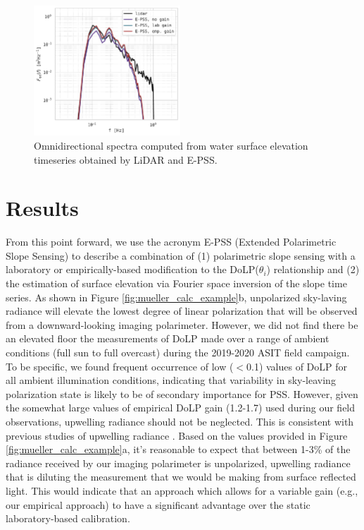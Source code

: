 \documentclass[letterpaper,journal]{IEEEtran}
\begin{document}
\begin{figure}[!ht]
    \centering
    \includegraphics[width=0.49\textwidth]{_figures/elevation_omnispect.pdf}
    \vspace{-25pt}
\caption{Omnidirectional spectra computed from water surface elevation timeseries obtained by LiDAR and E-PSS.}
\label{fig:elevation_omnispect}
\end{figure}

\newpage

\section{Results}
\label{sec:results}

From this point forward, we use the acronym E-PSS (Extended Polarimetric Slope Sensing) to describe a combination of (1) polarimetric slope sensing with a laboratory or empirically-based modification to the DoLP($\theta_i$) relationship and (2) the estimation of surface elevation via Fourier space inversion of the slope time series. As shown in Figure \ref{fig:mueller_calc_example}b, unpolarized sky-laving radiance will elevate the lowest degree of linear polarization that will be observed from a downward-looking imaging polarimeter. However, we did not find there be an elevated floor the measurements of DoLP made over a range of ambient conditions (full sun to full overcast) during the 2019-2020 ASIT field campaign. To be specific, we found frequent occurrence of low ($<$0.1) values of DoLP for all ambient illumination conditions, indicating that variability in sky-leaving polarization state is likely to be of secondary importance for PSS. However, given the somewhat large values of empirical DoLP gain (1.2-1.7) used during our field observations, upwelling radiance should not be neglected. This is consistent with previous studies of upwelling radiance \cite{You2011,ibrahim_relationship_2012}. Based on the values provided in Figure \ref{fig:mueller_calc_example}a, it's reasonable to expect that between 1-3\% of the radiance received by our imaging polarimeter is unpolarized, upwelling radiance that is diluting the measurement that we would be making from surface reflected light. This would indicate that an approach which allows for a variable gain (e.g., our empirical approach) to have a significant advantage over the static laboratory-based calibration.
\end{document}
